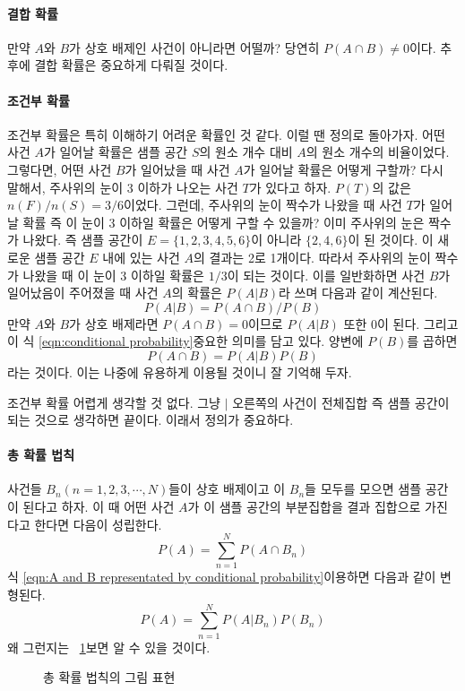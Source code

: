 \paragraph{결합 확률}
만약 $A$와 $B$가 상호 배제인 사건이 아니라면 어떨까? 당연히 $P(A\cap B)\neq 0$이다. 추후에 결합 확률은 중요하게 다뤄질 것이다.
\paragraph{조건부 확률}
조건부 확률은 특히 이해하기 어려운 확률인 것 같다. 이럴 땐 정의로 돌아가자.
어떤 사건 $A$가 일어날 확률은 샘플 공간 $S$의 원소 개수 대비 $A$의 원소 개수의 비율이었다.
그렇다면, 어떤 사건 $B$가 일어났을 때 사건 $A$가 일어날 확률은 어떻게 구할까?
다시 말해서, 주사위의 눈이 3 이하가 나오는 사건 $T$가 있다고 하자. $P(T)$의 값은 $n(F)/n(S)=3/6$이었다.
그런데, 주사위의 눈이 짝수가 나왔을 때 사건 $T$가 일어날 확률 즉 이 눈이 3 이하일 확률은 어떻게 구할 수 있을까?
이미 주사위의 눈은 짝수가 나왔다. 즉 샘플 공간이 $E=\{1,2,3,4,5,6\}$이 아니라 $\{2,4,6\}$이 된 것이다.
이 새로운 샘플 공간 $E$ 내에 있는 사건 $A$의 결과는 2로 1개이다.
따라서 주사위의 눈이 짝수가 나왔을 때 이 눈이 3 이하일 확률은 $1/3$이 되는 것이다.
이를 일반화하면 사건 $B$가 일어났음이 주어졌을 때 사건 $A$의 확률은 $P(A\vert B)$라 쓰며 다음과 같이 계산된다.
\begin{equation}
    P(A\vert B)=P(A \cap B)/P(B)\label{eqn:conditional probability}
\end{equation}
만약 $A$와 $B$가 상호 배제라면 $P(A \cap B)=0$이므로 $P(A\vert B)$ 또한 0이 된다.
그리고 이 식 \ref{eqn:conditional probability}\은 중요한 의미를 담고 있다. 양변에 $P(B)$를 곱하면
\begin{equation}
    P(A\cap B)=P(A\vert B)P(B)\label{eqn:A and B representated by conditional probability}
\end{equation}
라는 것이다. 이는 나중에 유용하게 이용될 것이니 잘 기억해 두자.
\par
조건부 확률 어렵게 생각할 것 없다. 그냥 $\vert$ 오른쪽의 사건이 전체집합 즉 샘플 공간이 되는 것으로 생각하면 끝이다. 이래서 정의가 중요하다.
\paragraph{총 확률 법칙}
사건들 $B_n(n=1,2,3,\cdots ,N)$들이 상호 배제이고 이 $B_n$들 모두를 모으면 샘플 공간이 된다고 하자.
이 때 어떤 사건 $A$가 이 샘플 공간의 부분집합을 결과 집합으로 가진다고 한다면 다음이 성립한다.
\begin{equation}
    P(A)=\sum_{n=1}^{N} P(A\cap B_n)
\end{equation}
식 \ref{eqn:A and B representated by conditional probability}\을 이용하면 다음과 같이 변형된다.
\begin{equation}
    P(A)=\sum_{n=1}^{N} P(A\vert B_n)P(B_n)
\end{equation}
왜 그런지는 \figurename~\ref{fig:total prob}\을 보면 알 수 있을 것이다.
\begin{figure}[!hpb]
    \centering
    \caption{총 확률 법칙의 그림 표현}\label{fig:total prob}
\end{figure}
